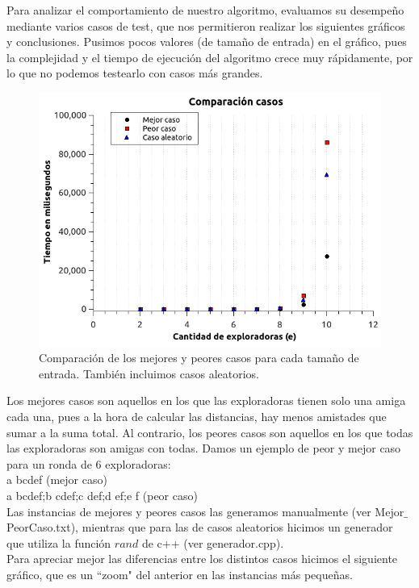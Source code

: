 \begin{itemize}
Para analizar el comportamiento de nuestro algoritmo, evaluamos su desempeño mediante varios casos de test, que nos permitieron realizar los siguientes gráficos y conclusiones. Pusimos pocos valores (de tamaño de entrada) en el gráfico, pues la complejidad y el tiempo de ejecución del algoritmo crece muy rápidamente, por lo que no podemos testearlo con casos más grandes. 

\begin{figure}[H] 
\begin{center}

  \includegraphics[width=\linewidth]{../graficos/ej3/ComparacionCasos.png}
  \caption{{\small Comparación de los mejores y peores casos para cada tamaño de entrada. También incluimos casos aleatorios.}} \label{asd}
\endminipage

\end{center}
\end{figure} 

Los mejores casos son aquellos en los que las exploradoras tienen solo una amiga cada una, pues a la hora de calcular las distancias, hay menos amistades que sumar a la suma total. Al contrario, los peores casos son aquellos en los que todas las exploradoras son amigas con todas. Damos un ejemplo de peor y mejor caso para un ronda de 6 exploradoras: \\
a bcdef (mejor caso) \\
a bcdef;b cdef;c def;d ef;e f (peor caso) \\
Las instancias de mejores y peores casos las generamos manualmente (ver Mejor$\_$PeorCaso.txt), mientras que para las de casos aleatorios hicimos un generador que utiliza la función $rand$ de c++ (ver generador.cpp). \\
Para apreciar mejor las diferencias entre los distintos casos hicimos el siguiente gráfico, que es un ``zoom"$ $ del anterior en las instancias más pequeñas.


\end{itemize}

